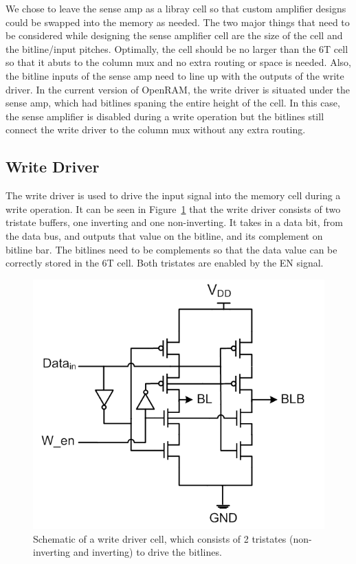 We chose to leave the sense amp as a libray cell so that custom
amplifier designs could be swapped into the memory as needed.  The two
major things that need to be considered while designing the sense
amplifier cell are the size of the cell and the bitline/input pitches.
Optimally, the cell should be no larger than the 6T cell so that it
abuts to the column mux and no extra routing or space is needed.
Also, the bitline inputs of the sense amp need to line up with the
outputs of the write driver.  In the current version of OpenRAM, the
write driver is situated under the sense amp, which had bitlines
spaning the entire height of the cell.  In this case, the sense
amplifier is disabled during a write operation but the bitlines still
connect the write driver to the column mux without any extra routing.


\subsection{Write Driver}
\label{sec:writedriver}
The write driver is used to drive the input signal into the memory
cell during a write operation.  It can be seen in
Figure~\ref{fig:write_driver} that the write driver consists of two
tristate buffers, one inverting and one non-inverting.  It takes in a
data bit, from the data bus, and outputs that value on the bitline,
and its complement on bitline bar.  The bitlines need to be
complements so that the data value can be correctly stored in the 6T
cell. Both tristates are enabled by the EN signal.

\begin{figure}[h!]
\centering
\includegraphics[scale=.8]{./figs/write_driver_schem.pdf}
\caption{Schematic of a write driver cell, which consists of 2 tristates (non-inverting and inverting) to drive the bitlines.}
\label{fig:write_driver}
\end{figure}

